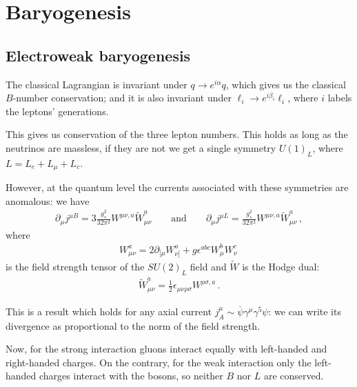\documentclass[main.tex]{subfiles}
\begin{document}
\section{Baryogenesis}

\subsection{Electroweak baryogenesis}


The classical Lagrangian is invariant under \(q \to e^{i \alpha } q\), which gives us the classical \(B\)-number conservation; and it is also invariant under \(\ell_i \to e^{i \beta_{i}} \ell_i\), where \(i\) labels the leptons' generations. 

This gives us conservation of the three lepton numbers. 
This holds as long as the neutrinos are massless, if they are not we get a single symmetry \(U(1)_L\), where \(L = L_e + L_\mu + L_c\). 

However, at the quantum level the currents associated with these symmetries are anomalous: we have 
%
\begin{align}
\partial_{\mu } j^{\mu B} = 3 \frac{g_s^2}{32 \pi^2} W^{\mu \nu , a} \widetilde{W}_{\mu \nu }^{a} 
\qquad \text{and} \qquad
\partial_{\mu } j^{\mu L} = \frac{g_s^2}{32 \pi^2} W^{\mu \nu , a} \widetilde{W}_{\mu \nu }^{a} 
\,,
\end{align}
%
where 
%
\begin{align}
W^{a}_{\mu \nu } = 2 \partial_{[\mu } W^{a}_{\nu ]} + g \epsilon^{abc} W^{b}_{\mu } W^{c}_{\nu }
\,
\end{align}
%
is the field strength tensor of the \(SU(2)_L\) field and \(\widetilde{W}\) is the Hodge dual: 
%
\begin{align}
\widetilde{W}^{a}_{\mu \nu } = \frac{1}{2} \epsilon_{\mu \nu \rho \sigma} W^{\rho \sigma , a} 
\,.
\end{align}

This is a result which holds for any axial current \(j^{\mu }_{A} \sim \overline{\psi} \gamma^{\mu } \gamma^{5} \psi \): we can write its divergence as proportional to the norm of the field strength. 

Now, for the strong interaction gluons interact equally with left-handed and right-handed charges. 
On the contrary, for the weak interaction only the left-handed charges interact with the bosons, so neither \(B\) nor \(L\) are conserved. 
\end{document}
